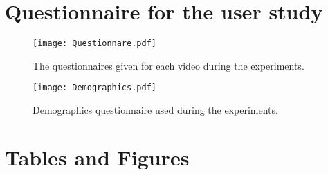 \chapter{Questionnaire for the user study}
\label{ch:questionnaire-for-the-user-study}
\begin{figure}[hbt!]
    \centering
    \texttt{[image: Questionnare.pdf]}
    \caption{The questionnaires given for each video during the experiments.}
    \label{fig:Questionnare}
\end{figure}

\begin{figure}[hbt!]
    \centering
    \texttt{[image: Demographics.pdf]}
    \caption{Demographics questionnaire used during the experiments.}
    \label{fig:Questionnare}
\end{figure}

%
\chapter{Tables and Figures}
\label{ch:tables-and-figures}

